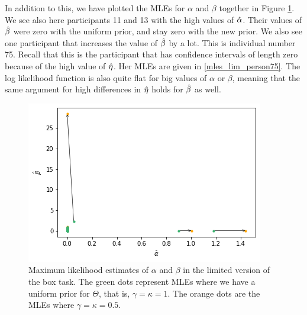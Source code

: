 In addition to this, we have plotted the MLEs for $\alpha$ and $\beta$ together in Figure \ref{fig:sensitivity_mles_lim_a_b}. We see also here participants 11 and 13 with the high values of $\hat{\alpha}$. Their values of $\hat{\beta}$ were zero with the uniform prior, and stay zero with the new prior. We also see one participant that increases the value of $\hat{\beta}$ by a lot. This is individual number 75. Recall that this is the participant that has confidence intervals of length zero because of the high value of $\hat{\eta}$. Her MLEs are given in \eqref{mles_lim_person75}. The log likelihood function is also quite flat for big values of $\alpha$ or $\beta$, meaning that the same argument for high differences in $\hat{\eta}$ holds for $\hat{\beta}$ as well.  
\begin{figure}
    \centering
    \includegraphics[scale=0.8]{pictures/Sensitivity/mles_lim_a_b.png}
    \caption[MLEs of $\alpha$ and $\beta$ for prior with $\gamma=\kappa=1$ and $\gamma=\kappa=0.5$, limited]{
    Maximum likelihood estimates of $\alpha$ and $\beta$ in the limited version of the box task. The green dots represent MLEs where we have a uniform prior for $\Theta$, that is, $\gamma=\kappa=1$. The orange dots are the MLEs where $\gamma=\kappa=0.5$.}
    \label{fig:sensitivity_mles_lim_a_b}
\end{figure}

